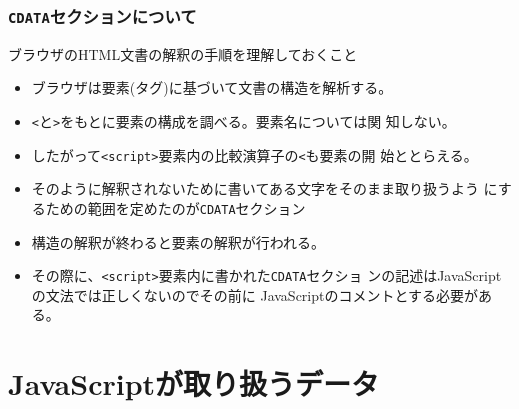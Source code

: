 \begin{frame}[containsverbatim]
 \frametitle{\texttt{CDATA}セクションについて}
 ブラウザのHTML文書の解釈の手順を理解しておくこと
 \begin{itemize}
  \item ブラウザは要素(タグ)に基づいて文書の構造を解析する。
  \item \Verb+<+と\Verb+>+をもとに要素の構成を調べる。要素名については関
        知しない。
  \item したがって\Verb+<script>+要素内の比較演算子の\Verb+<+も要素の開
        始ととらえる。
  \item そのように解釈されないために書いてある文字をそのまま取り扱うよう
        にするための範囲を定めたのが\texttt{CDATA}セクション
  \item 構造の解釈が終わると要素の解釈が行われる。
  \item その際に、\Verb+<script>+要素内に書かれた\texttt{CDATA}セクショ
        ンの記述はJavaScriptの文法では正しくないのでその前に
        JavaScriptのコメントとする必要がある。
 \end{itemize}
\end{frame}
\section{JavaScriptが取り扱うデータ}
